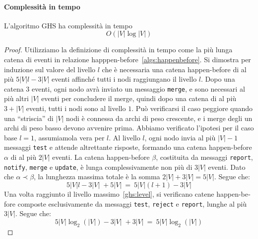 \documentclass[target=bach,aauheader=,style=]{thud}
\newcommand{\eng}[1]{\foreignlanguage{english}{#1}}
\begin{document}
\paragraph{Complessità in tempo}\label{ghs:complexity:time}
L'algoritmo GHS ha complessità in tempo
$$
O(|V|\log|V|)
$$
\begin{proof}
Utilizziamo la definizione di complessità in tempo come la più lunga catena di eventi in relazione \eng{happpen-before}~\ref{algs:happenbefore}. Si dimostra per induzione sul valore del livello $l$ che è necessaria una catena \eng{happen-before} di al più $5|V|l-3|V|$ eventi affinché tutti i nodi raggiungano il livello $l$. Dopo una catena $3$ eventi, ogni nodo avrà inviato un messaggio \lstinline{merge}, e sono necessari al più altri $|V|$ eventi per concludere il \eng{merge}, quindi dopo una catena di al più $3+|V|$ eventi, tutti i nodi sono al livello $1$. Può verificarsi il caso peggiore quando una ``striscia'' di $|V|$ nodi è connessa da archi di peso crescente, e i \eng{merge} degli un archi di peso basso devono avvenire prima. Abbiamo verificato l'ipotesi per il caso base $l=1$, assumiamola vera per $l$. Al livello $l$, ogni nodo invia al più $|V|-1$ messaggi \lstinline{test} e attende altrettante risposte, formando una catena \eng{happen-before} $\alpha$ di al più $2|V|$ eventi. La catena \eng{happen-before} $\beta$, costituita da messaggi \lstinline{report}, \lstinline{notify}, \lstinline{merge} e \lstinline{update}, è lunga complessivamente non più di $3|V|$ eventi. Dato che $\alpha\prec\beta$, la lunghezza massima totale è la somma $2|V|+3|V|=5|V|$. Segue che:
$$
5|V|l-3|V|\;+5|V|\:=\:5|V|(l+1)-3|V|
$$
Una volta raggiunto il livello massimo~\ref{ghs:level}, si verificano catene \eng{happen-before} composte esclusivamente da messaggi \lstinline{test}, \lstinline{reject} e \lstinline{report}, lunghe al più $3|V|$. Segue che:
$$
5|V|\log_2(|V|)-3|V|\;+3|V|\:=\:5|V|\log_2(|V|)
$$
\end{proof}
\end{document}
